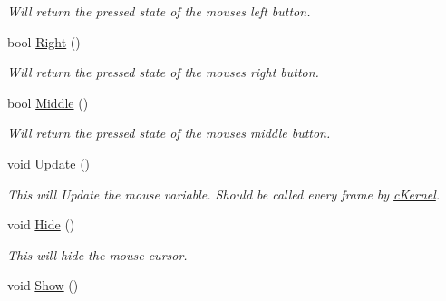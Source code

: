 \begin{DoxyCompactItemize}
\begin{DoxyCompactList}\small\item\em Will return the pressed state of the mouses left button. \end{DoxyCompactList}\item 
\hypertarget{classc_mouse_a4d84d97d051d920a476e5b300fc38396}{
bool \hyperlink{classc_mouse_a4d84d97d051d920a476e5b300fc38396}{Right} ()}
\label{classc_mouse_a4d84d97d051d920a476e5b300fc38396}

\begin{DoxyCompactList}\small\item\em Will return the pressed state of the mouses right button. \end{DoxyCompactList}\item 
\hypertarget{classc_mouse_ae372f0b8e20928233060adc9a7450a93}{
bool \hyperlink{classc_mouse_ae372f0b8e20928233060adc9a7450a93}{Middle} ()}
\label{classc_mouse_ae372f0b8e20928233060adc9a7450a93}

\begin{DoxyCompactList}\small\item\em Will return the pressed state of the mouses middle button. \end{DoxyCompactList}\item 
\hypertarget{classc_mouse_a558d192a5c2df1352d1b8de7275a9359}{
void \hyperlink{classc_mouse_a558d192a5c2df1352d1b8de7275a9359}{Update} ()}
\label{classc_mouse_a558d192a5c2df1352d1b8de7275a9359}

\begin{DoxyCompactList}\small\item\em This will Update the mouse variable. Should be called every frame by \hyperlink{classc_kernel}{cKernel}. \end{DoxyCompactList}\item 
\hypertarget{classc_mouse_a65b10c846c3e0ac6d77f398095c66164}{
void \hyperlink{classc_mouse_a65b10c846c3e0ac6d77f398095c66164}{Hide} ()}
\label{classc_mouse_a65b10c846c3e0ac6d77f398095c66164}

\begin{DoxyCompactList}\small\item\em This will hide the mouse cursor. \end{DoxyCompactList}\item 
\hypertarget{classc_mouse_a54300b8fe1f8c5c0ec88e7ae26eff0e0}{
void \hyperlink{classc_mouse_a54300b8fe1f8c5c0ec88e7ae26eff0e0}{Show} ()}
\label{classc_mouse_a54300b8fe1f8c5c0ec88e7ae26eff0e0}


\end{DoxyCompactItemize}
